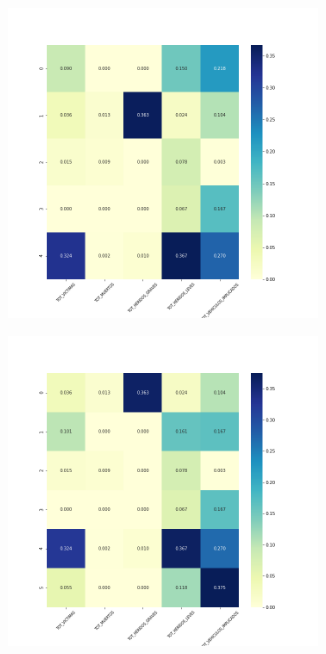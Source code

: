 \begin{figure}[H]
\begin{subfigure}{.5\textwidth}
\end{subfigure}
\begin{subfigure}{.5\textwidth}
  \centering
  \includegraphics[width=0.9\textwidth]{imagenes/case2/agglomerative/heatmaps/hm_agglomerative_case2_entrada_k5.png}
\end{subfigure}
\begin{subfigure}{.5\textwidth}
  \centering
  \includegraphics[width=0.9\textwidth]{imagenes/case2/agglomerative/heatmaps/hm_agglomerative_case2_entrada_k6.png}

\end{subfigure}
\end{figure}
